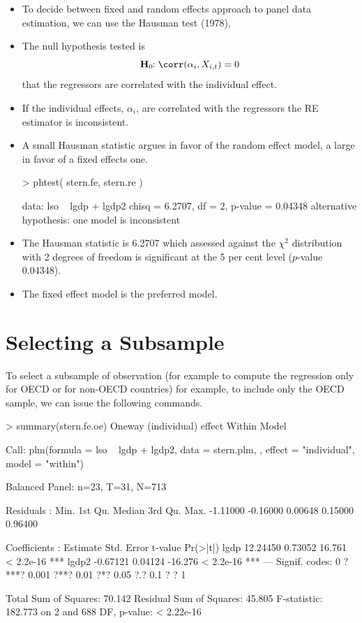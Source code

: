 \documentclass[landscape,letterpaper,9pt]{article}
\newcommand\cbox[1]{\colorbox{darkyellow}{#1}}
\begin{document}
\newpage
\begin{itemize}
\item To decide between  fixed  and random effects approach to panel data estimation, we can
use the \cbox{Hausman} test (1978),
 \item The null  \cbox{hypothesis} tested is
$$\mathbf{H}_0\!\!:  \corr (\alpha_i, X_{i,t}) = 0$$
 that
 the regressors are correlated with the individual effect.
\item If the individual effects, \(\alpha_i\), are correlated with
the regressors  the RE estimator is inconsistent.
\item   A small Hausman statistic argues in favor of the random effect model, a large in favor of a fixed effects one.

\vspace{.1in}
\begin{CVerbatim}
> phtest( stern.fe, stern.re )

        \fbox{\textcolor{red}{Hausman Test}}

data:  lso ~ lgdp + lgdp2
chisq = 6.2707, df = 2, p-value = 0.04348
alternative hypothesis: one model is inconsistent
\end{CVerbatim}
\vspace{.1in}
\item 
 The Hausman statistic is 6.2707   which  assessed against the
\(\chi^2\) distribution with 2 degrees of freedom is significant at
the 5 per cent level ($p$-value 0.04348). 
\item The \cbox{fixed effect} model is the preferred
model.
\end{itemize}
\newpage
\section{Selecting a Subsample}
To select a subsample of observation 
(for example to compute the regression  only for OECD or for non-OECD countries)
 for example, to
include only the OECD sample, we can issue the following commands.
\vspace{.1in}
\begin{CVerbatim}
> summary(stern.fe.oe)
Oneway (individual) effect Within Model

Call:
plm(formula = lso ~ lgdp + lgdp2, data = stern.plm, 
   \fbox{\textcolor{red}{subset = oe == 1}}, effect = "individual", model = "within")

Balanced Panel: n=23, T=31, N=713

Residuals :
    Min.  1st Qu.   Median  3rd Qu.     Max.
-1.11000 -0.16000  0.00648  0.15000  0.96400

Coefficients :
      Estimate Std. Error t-value  Pr(>|t|)
lgdp  12.24450    0.73052  16.761 < 2.2e-16 ***
lgdp2 -0.67121    0.04124 -16.276 < 2.2e-16 ***
---
Signif. codes:  0 ?***? 0.001 ?**? 0.01 ?*? 0.05 ?.? 0.1 ? ? 1

Total Sum of Squares:    70.142
Residual Sum of Squares: 45.805
F-statistic: 182.773 on 2 and 688 DF, p-value: < 2.22e-16
\end{CVerbatim}
\end{document}
